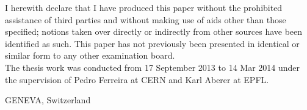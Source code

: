 \begin{declaration}

I herewith declare that I have produced this paper without the prohibited assistance of third parties and without making use of aids other than those specified; notions taken over directly or indirectly from other sources have been identified as such. This paper has not previously been presented in identical or similar form to any other examination board. \\

The thesis work was conducted from 17 September 2013 to 14 Mar 2014 under the supervision of Pedro Ferreira at CERN and Karl Aberer at EPFL.

\vspace{8mm}

GENEVA, Switzerland

\end{declaration}

\nocite{*}
